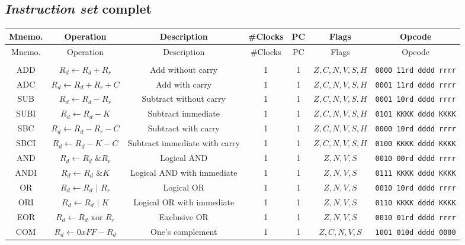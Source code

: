 \documentclass[11pt]{article}
\begin{document}
\subsection{\emph{Instruction set} complet}
\tiny
\noindent\begin{center}
\begin{longtable}{|c|c|c|c|c|c|c|}
\hline
Mnemo. & Operation & Description & \#Clocks & PC & Flags & Opcode\\
\hline\hline
\endhead

\hline\hline
Mnemo. & Operation & Description & \#Clocks & PC & Flags & Opcode\\
\hline
\endfoot

\multicolumn{7}{|c|}{Arithmetic} \\\hline
ADD & $R_d \leftarrow R_d + R_r$ & Add without carry & 1 & 1 & $Z, C, N, V, S, H$ & \texttt{0000 11rd dddd rrrr}\\
ADC & $R_d \leftarrow R_d + R_r + C$ & Add with carry & 1 & 1 & $Z, C, N, V, S, H$ & \texttt{0001 11rd dddd rrrr}\\
SUB & $R_d \leftarrow R_d - R_r$ & Subtract without carry & 1 & 1 & $Z, C, N, V, S, H$ & \texttt{0001 10rd dddd rrrr}\\
SUBI & $R_d \leftarrow R_d - K$ & Subtract immediate & 1 & 1 & $Z, C, N, V, S, H$ & \texttt{0101 KKKK dddd KKKK}\\
SBC & $R_d \leftarrow R_d - R_r - C$ & Subtract with carry & 1 & 1 & $Z, C, N, V, S, H$ & \texttt{0000 10rd dddd rrrr}\\
SBCI & $R_d \leftarrow R_d - K - C$ & Subtract immediate with carry & 1 & 1 & $Z, C, N, V, S, H$ & \texttt{0100 KKKK dddd KKKK}\\
AND & $R_d \leftarrow R_d \text{ \& } R_r$ & Logical AND & 1 & 1 & $Z, N, V, S$ & \texttt{0010 00rd dddd rrrr}\\
ANDI & $R_d \leftarrow R_d \text{ \& } K$ & Logical AND with immediate & 1 & 1 & $Z, N, V, S$ & \texttt{0111 KKKK dddd KKKK}\\
OR & $R_d \leftarrow R_d \text{ | } R_r$ & Logical OR & 1 & 1 & $Z, N, V, S$ & \texttt{0010 10rd dddd rrrr}\\
ORI & $R_d \leftarrow R_d \text{ | } K$ & Logical OR with immediate & 1 & 1 & $Z, N, V, S$ & \texttt{0110 KKKK dddd KKKK}\\
EOR & $R_d \leftarrow R_d \text{ xor } R_r$ & Exclusive OR & 1 & 1 & $Z, N, V, S$ & \texttt{0010 01rd dddd rrrr}\\
COM & $R_d \leftarrow 0xFF - R_d$ & One's complement & 1 & 1 & $Z, C, N, V, S$ & \texttt{1001 010d dddd 0000}\\

\end{longtable}
\end{center}
\end{document}
